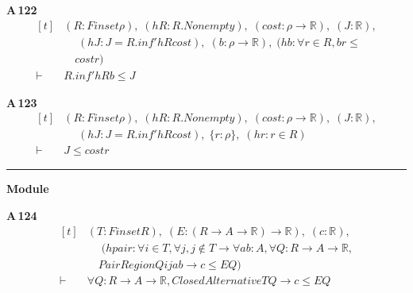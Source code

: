 \noindent\textbf{A\,122}\quad{}
{\footnotesize\[ \begin{aligned}[t]
&(\mathit{R} : \mathit{Finset} \rho ),\; (\mathit{hR} : \mathit{R}.\mathit{Nonempty}),\; (\mathit{cost} : \rho \to \mathbb{R} ),\; (\mathit{J} : \mathbb{R} ),\\
&\quad \; (\mathit{hJ} : \mathit{J} = \mathit{R}.\mathit{inf'} \mathit{hR} \mathit{cost}),\; (\mathit{b} : \rho \to \mathbb{R} ),\; (\mathit{hb} : \forall \mathit{r} \in \mathit{R}, \mathit{b} \mathit{r} \leq\\
&\quad \mathit{cost} \mathit{r})\\
\vdash\;&\mathit{R}.\mathit{inf'} \mathit{hR} \mathit{b} \leq \mathit{J}
\end{aligned} \]}

\noindent\textbf{A\,123}\quad{}
{\footnotesize\[ \begin{aligned}[t]
&(\mathit{R} : \mathit{Finset} \rho ),\; (\mathit{hR} : \mathit{R}.\mathit{Nonempty}),\; (\mathit{cost} : \rho \to \mathbb{R} ),\; (\mathit{J} : \mathbb{R} ),\\
&\quad \; (\mathit{hJ} : \mathit{J} = \mathit{R}.\mathit{inf'} \mathit{hR} \mathit{cost}),\; \{ \mathit{r} : \rho \},\; (\mathit{hr} : \mathit{r} \in \mathit{R})\\
\vdash\;&\mathit{J} \leq \mathit{cost} \mathit{r}
\end{aligned} \]}

\vspace{4pt}\noindent\rule{\columnwidth}{0.4pt}\par\vspace{2pt}
\noindent\textbf{Module }\par\vspace{3pt}

\noindent\textbf{A\,124}\quad{}
{\footnotesize\[ \begin{aligned}[t]
&(\mathit{T} : \mathit{Finset} \mathit{R}),\; (\mathit{E} : (\mathit{R} \to \mathit{A} \to \mathbb{R} ) \to \mathbb{R} ),\; (\mathit{c} : \mathbb{R} ),\\
&\quad \; (\mathit{hpair} : \forall \mathit{i} \in \mathit{T}, \forall \mathit{j}, \mathit{j} \notin \mathit{T} \to \forall \mathit{a} \mathit{b} : \mathit{A}, \forall \mathit{Q} : \mathit{R} \to \mathit{A} \to \mathbb{R} ,\\
&\quad \mathit{PairRegion} \mathit{Q} \mathit{i} \mathit{j} \mathit{a} \mathit{b} \to \mathit{c} \leq \mathit{E} \mathit{Q})\\
\vdash\;&\forall \mathit{Q} : \mathit{R} \to \mathit{A} \to \mathbb{R} , \mathit{ClosedAlternative} \mathit{T} \mathit{Q} \to \mathit{c} \leq \mathit{E} \mathit{Q}
\end{aligned} \]}


